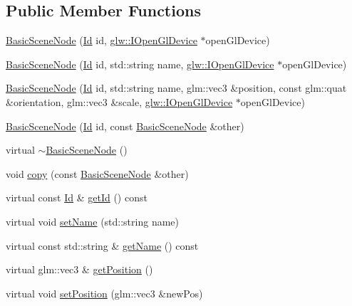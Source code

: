 \subsection*{Public Member Functions}
\begin{DoxyCompactItemize}
\item 
\hyperlink{classglr_1_1BasicSceneNode_a0d6ce7488ef828f9cd0798cc1be4cf6b}{Basic\-Scene\-Node} (\hyperlink{classglr_1_1Id}{Id} id, \hyperlink{classglr_1_1glw_1_1IOpenGlDevice}{glw\-::\-I\-Open\-Gl\-Device} $\ast$open\-Gl\-Device)
\item 
\hyperlink{classglr_1_1BasicSceneNode_ac05abe6d5d3727c36f58888f8d169910}{Basic\-Scene\-Node} (\hyperlink{classglr_1_1Id}{Id} id, std\-::string name, \hyperlink{classglr_1_1glw_1_1IOpenGlDevice}{glw\-::\-I\-Open\-Gl\-Device} $\ast$open\-Gl\-Device)
\item 
\hyperlink{classglr_1_1BasicSceneNode_a84be0e82fbb8f31d0ad810f867eb91d4}{Basic\-Scene\-Node} (\hyperlink{classglr_1_1Id}{Id} id, std\-::string name, glm\-::vec3 \&position, const glm\-::quat \&orientation, glm\-::vec3 \&scale, \hyperlink{classglr_1_1glw_1_1IOpenGlDevice}{glw\-::\-I\-Open\-Gl\-Device} $\ast$open\-Gl\-Device)
\item 
\hyperlink{classglr_1_1BasicSceneNode_aec64a71d244696656b7b9b865e9393ab}{Basic\-Scene\-Node} (\hyperlink{classglr_1_1Id}{Id} id, const \hyperlink{classglr_1_1BasicSceneNode}{Basic\-Scene\-Node} \&other)
\item 
virtual \hyperlink{classglr_1_1BasicSceneNode_a3e68039082791b51e1683d900fc9a258}{$\sim$\-Basic\-Scene\-Node} ()
\item 
void \hyperlink{classglr_1_1BasicSceneNode_aab3a02c6ef23affe6cb9252cccb9c19a}{copy} (const \hyperlink{classglr_1_1BasicSceneNode}{Basic\-Scene\-Node} \&other)
\item 
virtual const \hyperlink{classglr_1_1Id}{Id} \& \hyperlink{classglr_1_1BasicSceneNode_aa942ba69e78e95aface51616fa14fffe}{get\-Id} () const 
\item 
virtual void \hyperlink{classglr_1_1BasicSceneNode_aa1822565f19302533edc20eeeab5d67c}{set\-Name} (std\-::string name)
\item 
virtual const std\-::string \& \hyperlink{classglr_1_1BasicSceneNode_a2ea663be310f731848122c522e735eec}{get\-Name} () const 
\item 
virtual glm\-::vec3 \& \hyperlink{classglr_1_1BasicSceneNode_a5a8616cc44759599b69f66ab58b13496}{get\-Position} ()
\item 
virtual void \hyperlink{classglr_1_1BasicSceneNode_acf18999cd237cc434d2fef249d3762e9}{set\-Position} (glm\-::vec3 \&new\-Pos)

\end{DoxyCompactItemize}
